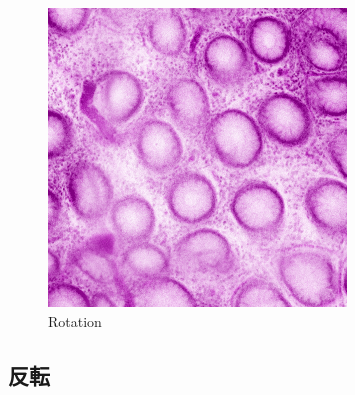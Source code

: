 \begin{figure}[H]
\begin{minipage}{0.24\columnwidth}
		\subcaption{180\deg}
	\end{minipage}
	\begin{minipage}{0.24\columnwidth}
		\centering
		\includegraphics[clip, width=\linewidth]{fig/preprocessing/data_aug/rotate/ROTATION_270}
		\subcaption{270\deg}
	\end{minipage}
	
	\caption{Rotation}
	\label{fig:回転}

\end{figure}


\subsection*{反転}


